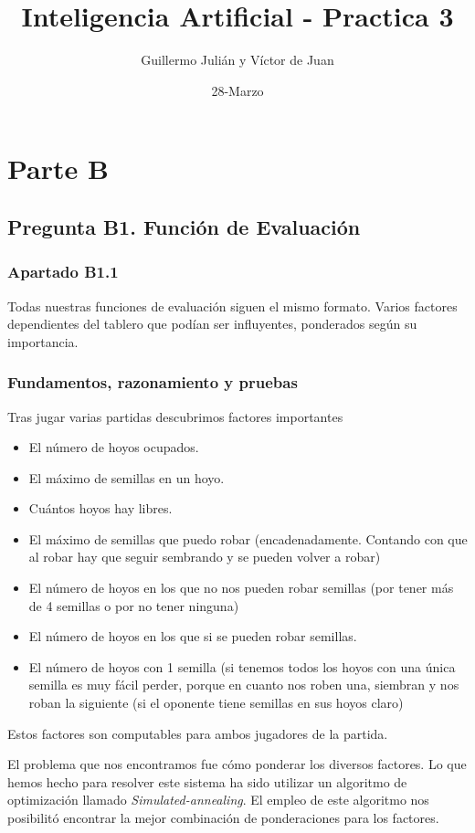 \documentclass[nochap]{apuntes}
\author{Guillermo Julián y Víctor de Juan}
\date{28-Marzo}
\title{Inteligencia Artificial - Practica 3}
\begin{document}
\maketitle

\section*{Parte B}
\subsection*{Pregunta B1. Función de Evaluación}
\subsubsection*{Apartado B1.1}

Todas nuestras funciones de evaluación siguen el mismo formato. Varios factores dependientes del tablero que podían ser influyentes, ponderados según su importancia.

\subsubsection*{Fundamentos, razonamiento y pruebas}
Tras jugar varias partidas descubrimos factores importantes

\begin{itemize}
\item El número de hoyos ocupados.
\item El máximo de semillas en un hoyo.
\item Cuántos hoyos hay libres.
\item El máximo de semillas que puedo robar (encadenadamente. Contando con que al robar hay que seguir sembrando y se pueden volver a robar)
\item El número de hoyos en los que no nos pueden robar semillas (por tener más de 4 semillas o por no tener ninguna)
\item El número de hoyos en los que si se pueden robar semillas.
\item El número de hoyos con 1 semilla (si tenemos todos los hoyos con una única semilla es muy fácil perder, porque en cuanto nos roben una, siembran y nos roban la siguiente (si el oponente tiene semillas en sus hoyos claro)
\end{itemize}

Estos factores son computables para ambos jugadores de la partida.

El problema que nos encontramos fue cómo ponderar los diversos factores. Lo que hemos hecho para resolver este sistema ha sido utilizar un algoritmo de optimización llamado \textit{Simulated-annealing}. El empleo de este algoritmo nos posibilitó encontrar la mejor combinación de ponderaciones para los factores.
\end{document}
